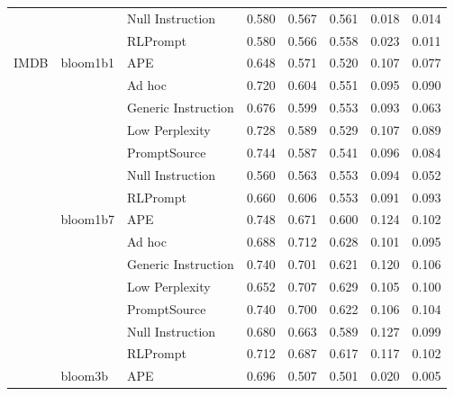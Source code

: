 \begin{supertabular}{lllrrrrr}
              &        & Null Instruction &            0.580 &           0.567 &          0.561 &        0.018 &    0.014 \\
              &        & RLPrompt &            0.580 &           0.566 &          0.558 &        0.023 &    0.011 \\
IMDB & bloom1b1 & APE &            0.648 &           0.571 &          0.520 &        0.107 &    0.077 \\
              &        & Ad hoc &            0.720 &           0.604 &          0.551 &        0.095 &    0.090 \\
              &        & Generic Instruction &            0.676 &           0.599 &          0.553 &        0.093 &    0.063 \\
              &        & Low Perplexity &            0.728 &           0.589 &          0.529 &        0.107 &    0.089 \\
              &        & PromptSource &            0.744 &           0.587 &          0.541 &        0.096 &    0.084 \\
              &        & Null Instruction &            0.560 &           0.563 &          0.553 &        0.094 &    0.052 \\
              &        & RLPrompt &            0.660 &           0.606 &          0.553 &        0.091 &    0.093 \\
              & bloom1b7 & APE &            0.748 &           0.671 &          0.600 &        0.124 &    0.102 \\
              &        & Ad hoc &            0.688 &           0.712 &          0.628 &        0.101 &    0.095 \\
              &        & Generic Instruction &            0.740 &           0.701 &          0.621 &        0.120 &    0.106 \\
              &        & Low Perplexity &            0.652 &           0.707 &          0.629 &        0.105 &    0.100 \\
              &        & PromptSource &            0.740 &           0.700 &          0.622 &        0.106 &    0.104 \\
              &        & Null Instruction &            0.680 &           0.663 &          0.589 &        0.127 &    0.099 \\
              &        & RLPrompt &            0.712 &           0.687 &          0.617 &        0.117 &    0.102 \\
              & bloom3b & APE &            0.696 &           0.507 &          0.501 &        0.020 &    0.005 \\

\end{supertabular}

